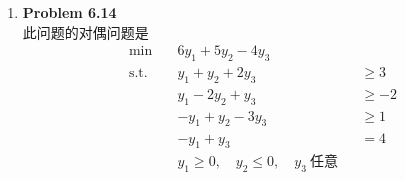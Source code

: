 \documentclass{ctexart}
\begin{document}
\begin{enumerate}[label=\arabic*.]
\begin{enumerate}[label=(\arabic*)]
\[            \]
            因此可行基为$B_{12},B_{13},B_{24},B_{34}$。对应到原变量$(x_1,x_2)$的可行域顶点分别是
            \[
                (5,\tfrac{9}{2}),\ (5,0),\ (0,2),\ (0,0).
            \]
            比较目标函数值可得最优解为
            \[
                x_1^*=5,\quad x_2^*=\frac{9}{2},\quad z_{\max}=\frac{29}{2}.
            \]
        \end{enumerate}
    \item \textbf{Problem 6.14}\\
        此问题的对偶问题是\[\begin{aligned}
            \min \quad &6y_1+5y_2-4y_3\\
            \text{s.t.} \quad &y_1+y_2+2y_3 &&\ge 3\\
            &y_1-2y_2+y_3 &&\ge -2\\
            &-y_1+y_2-3y_3 &&\ge 1\\
            &-y_1+y_3&&=4\\
            &y_1\ge 0,\quad y_2\le 0,\quad y_3\ \text{任意}
        \end{aligned}\]
\end{enumerate}
\end{document}
